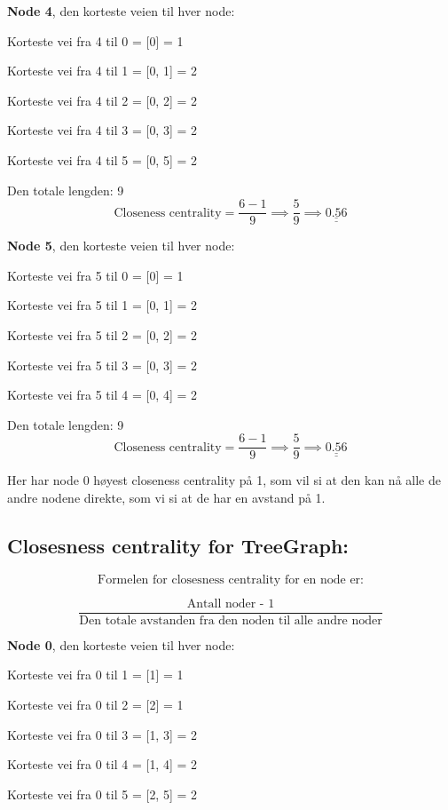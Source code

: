 \documentclass[11pt]{article}
\begin{document}
\textbf{Node 4}, den korteste veien til hver node:

Korteste vei fra 4 til 0 = {[}0{]} = 1

Korteste vei fra 4 til 1 = {[}0, 1{]} = 2

Korteste vei fra 4 til 2 = {[}0, 2{]} = 2

Korteste vei fra 4 til 3 = {[}0, 3{]} = 2

Korteste vei fra 4 til 5 = {[}0, 5{]} = 2

Den totale lengden: 9
\[\text{Closeness centrality} = \frac{6 - 1}{9} \implies \frac{5}{9} \implies\underline{\underline{ 0.56 }}\]

\textbf{Node 5}, den korteste veien til hver node:

Korteste vei fra 5 til 0 = {[}0{]} = 1

Korteste vei fra 5 til 1 = {[}0, 1{]} = 2

Korteste vei fra 5 til 2 = {[}0, 2{]} = 2

Korteste vei fra 5 til 3 = {[}0, 3{]} = 2

Korteste vei fra 5 til 4 = {[}0, 4{]} = 2

Den totale lengden: 9
\[\text{Closeness centrality} = \frac{6 - 1}{9} \implies \frac{5}{9} \implies\underline{\underline{ 0.56 }}\]

Her har node 0 høyest closeness centrality på 1, som vil si at den kan
nå alle de andre nodene direkte, som vi si at de har en avstand på 1.

    \hypertarget{closesness-centrality-for-treegraph}{%
\subsection*{Closesness centrality for
TreeGraph:}\label{closesness-centrality-for-treegraph}}

\[\text{Formelen for closesness centrality for en node er:}\]

\[\frac{\text{Antall noder - 1}}{\text{Den totale avstanden fra den noden til alle andre noder}}\]

\textbf{Node 0}, den korteste veien til hver node:

Korteste vei fra 0 til 1 = {[}1{]} = 1

Korteste vei fra 0 til 2 = {[}2{]} = 1

Korteste vei fra 0 til 3 = {[}1, 3{]} = 2

Korteste vei fra 0 til 4 = {[}1, 4{]} = 2

Korteste vei fra 0 til 5 = {[}2, 5{]} = 2
\end{document}
